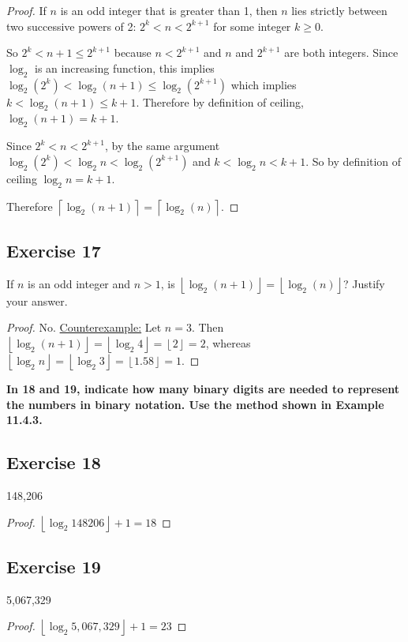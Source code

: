 \documentclass[14pt]{extarticle}
\newcommand{\cy}{\color{cyan}}
\newcommand{\floor}[1]{{\left\lfloor#1\right\rfloor}}
\newcommand{\ceil}[1]{{\left\lceil#1\right\rceil}}
\begin{document}
\begin{proof}
    If \(n\) is an odd integer that is greater than 1, then \(n\) lies strictly between two successive powers of 2: \(2^k < n <
    2^{k+1}\) for some integer \(k \geq 0\).

    So \(2^k < n+1 \leq 2^{k+1}\) because \(n < 2^{k+1}\) and \(n\) and \(2^{k+1}\) are both integers. Since \(\log_2\) is an
    increasing function, this implies \(\log_2(2^k) < \log_2(n+1) \leq \log_2(2^{k+1})\) which implies \(k < \log_2(n+1) \leq k + 1\). Therefore by definition of ceiling, \(\log_2(n+1) =
    k+1\).

    Since \(2^k < n < 2^{k+1}\), by the same argument \(\log_2(2^k) < \log_2 n < \log_2(2^{k+1})\) and \(k < \log_2 n
    < k+1\). So by definition of ceiling \(\log_2 n = k+1\).

    Therefore \(\ceil{\log_2(n + 1)} = \ceil{\log_2(n)}\).
\end{proof}

\subsection{Exercise 17}
If \(n\) is an odd integer and \(n > 1\), is \(\floor{\log_2(n + 1)} = \floor{\log_2(n)}\)? Justify your answer.

\begin{proof}
    No. \underline{Counterexample:} Let \(n = 3\). Then \(\floor{\log_2 (n + 1)} =  \floor{\log_2 4} = \floor{2} = 2\),
    whereas \(\floor{\log_2 n} = \floor{\log_2 3} = \floor{1.58} = 1\).
\end{proof}

{\bf \cy In 18 and 19, indicate how many binary digits are needed to represent the numbers in binary notation. Use the
method shown in Example 11.4.3.}

\subsection{Exercise 18}
148,206

\begin{proof}
    \(\floor{\log_2 148206} + 1 = 18\)
\end{proof}

\subsection{Exercise 19}
5,067,329

\begin{proof}
    \(\floor{\log_2 5,067,329} + 1 = 23\)
\end{proof}
\end{document}
